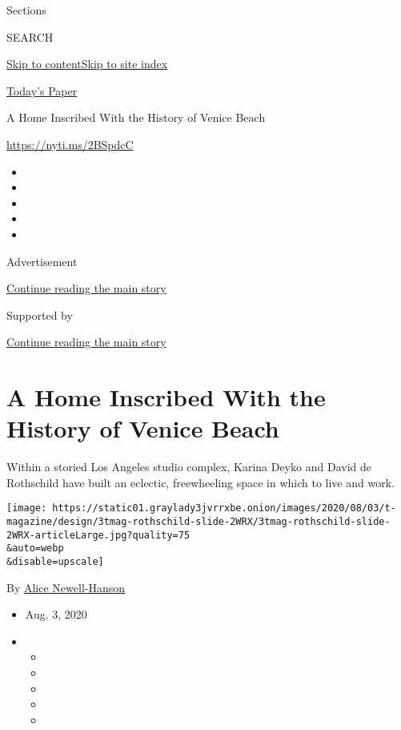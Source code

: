 Sections

SEARCH

\protect\hyperlink{site-content}{Skip to
content}\protect\hyperlink{site-index}{Skip to site index}

\href{https://myaccount.nytimes3xbfgragh.onion/auth/login?response_type=cookie\&client_id=vi}{}

\href{https://www.nytimes3xbfgragh.onion/section/todayspaper}{Today's
Paper}

A Home Inscribed With the History of Venice Beach

\url{https://nyti.ms/2BSpdcC}

\begin{itemize}
\item
\item
\item
\item
\item
\end{itemize}

Advertisement

\protect\hyperlink{after-top}{Continue reading the main story}

Supported by

\protect\hyperlink{after-sponsor}{Continue reading the main story}

\hypertarget{a-home-inscribed-with-the-history-of-venice-beach}{%
\section{A Home Inscribed With the History of Venice
Beach}\label{a-home-inscribed-with-the-history-of-venice-beach}}

Within a storied Los Angeles studio complex, Karina Deyko and David de
Rothschild have built an eclectic, freewheeling space in which to live
and work.

\texttt{[image: https://static01.graylady3jvrrxbe.onion/images/2020/08/03/t-magazine/design/3tmag-rothschild-slide-2WRX/3tmag-rothschild-slide-2WRX-articleLarge.jpg?quality=75\\\&auto=webp\\\&disable=upscale]}

By
\href{https://www.nytimes3xbfgragh.onion/by/alice-newell-hanson}{Alice
Newell-Hanson}

\begin{itemize}
\item
  Aug. 3, 2020
\item
  \begin{itemize}
  \item
  \item
  \item
  \item
  \item
  \end{itemize}
\end{itemize}

